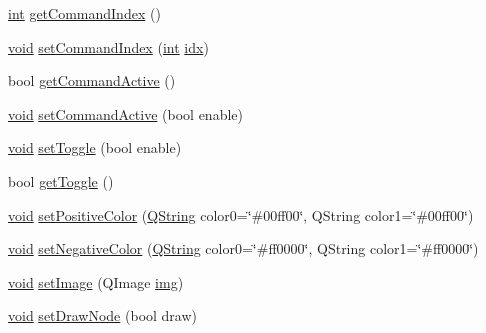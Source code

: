 \begin{DoxyCompactItemize}
\hyperlink{ioapi_8h_a787fa3cf048117ba7123753c1e74fcd6}{int} \hyperlink{group___u_a_v_object_widget_utils_ga9256f0cba8c457485bfc00b660076d2b}{get\-Command\-Index} ()
\item 
\hyperlink{group___u_a_v_objects_plugin_ga444cf2ff3f0ecbe028adce838d373f5c}{void} \hyperlink{group___u_a_v_object_widget_utils_ga85c1946a33e5309ac2b9aa3675671935}{set\-Command\-Index} (\hyperlink{ioapi_8h_a787fa3cf048117ba7123753c1e74fcd6}{int} \hyperlink{uavobjecttemplate_8m_a49654e4709f40aecccada266daa32fc6}{idx})
\item 
bool \hyperlink{group___u_a_v_object_widget_utils_ga63b0822569ce8326323c15159682c57e}{get\-Command\-Active} ()
\item 
\hyperlink{group___u_a_v_objects_plugin_ga444cf2ff3f0ecbe028adce838d373f5c}{void} \hyperlink{group___u_a_v_object_widget_utils_ga224ddcb050b9008c2352ca9c1318159d}{set\-Command\-Active} (bool enable)
\item 
\hyperlink{group___u_a_v_objects_plugin_ga444cf2ff3f0ecbe028adce838d373f5c}{void} \hyperlink{group___u_a_v_object_widget_utils_ga55f38aaacbac71e094d96baf3df429a4}{set\-Toggle} (bool enable)
\item 
bool \hyperlink{group___u_a_v_object_widget_utils_gab63ea3448c47f2e65a056ec49b30e0d1}{get\-Toggle} ()
\item 
\hyperlink{group___u_a_v_objects_plugin_ga444cf2ff3f0ecbe028adce838d373f5c}{void} \hyperlink{group___u_a_v_object_widget_utils_ga1318ec003e5b6d72bb03b061f6df3996}{set\-Positive\-Color} (\hyperlink{group___u_a_v_objects_plugin_gab9d252f49c333c94a72f97ce3105a32d}{Q\-String} color0=\char`\"{}\#00ff00\char`\"{}, Q\-String color1=\char`\"{}\#00ff00\char`\"{})
\item 
\hyperlink{group___u_a_v_objects_plugin_ga444cf2ff3f0ecbe028adce838d373f5c}{void} \hyperlink{group___u_a_v_object_widget_utils_gaa22c8cab4fa7424caf1a9168f12365e3}{set\-Negative\-Color} (\hyperlink{group___u_a_v_objects_plugin_gab9d252f49c333c94a72f97ce3105a32d}{Q\-String} color0=\char`\"{}\#ff0000\char`\"{}, Q\-String color1=\char`\"{}\#ff0000\char`\"{})
\item 
\hyperlink{group___u_a_v_objects_plugin_ga444cf2ff3f0ecbe028adce838d373f5c}{void} \hyperlink{group___u_a_v_object_widget_utils_ga85ed2c5bf8ae66f16496bd5fef25362b}{set\-Image} (Q\-Image \hyperlink{glext_8h_a27b0ff5636e690ca10d0abb150a9e9ed}{img})
\item 
\hyperlink{group___u_a_v_objects_plugin_ga444cf2ff3f0ecbe028adce838d373f5c}{void} \hyperlink{group___u_a_v_object_widget_utils_ga90b5c3c03fb1cca75ba471125d93b550}{set\-Draw\-Node} (bool draw)

\end{DoxyCompactItemize}
